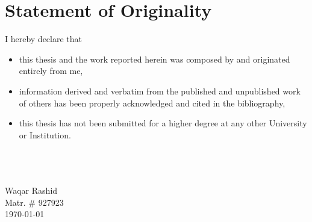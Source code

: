 \documentclass[../main.tex]{subfile}
\begin{document}
\chapter*{\centering Statement of Originality}I hereby declare that
\begin{itemize}
\item this thesis and the work reported herein was composed by and originated entirely from me,
\item information derived and verbatim from the published and unpublished work of others has been properly acknowledged and cited in the bibliography,
\item this thesis has not been submitted for a higher degree at any other University or Institution.
\end{itemize}

\large
\vspace{20px}
\textbf{}\\
\makebox[1.5in]{\hrulefill}\\
\vspace{5px}\\
Waqar Rashid\\
Matr. \# 927923\\
\today
\end{document}
